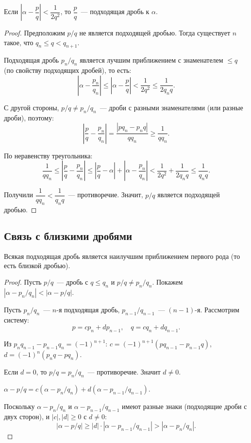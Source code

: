 \documentclass[12pt]{article}
\begin{document}
	\begin{theorem}
		Если $\left|\alpha - \dfrac{p}{q}\right| < \dfrac{1}{2q^2}$, то $\dfrac{p}{q}$~--- подходящая дробь к $\alpha$.
	\end{theorem}
	
	\begin{proof}
		Предположим $p/q$ не является подходящей дробью. Тогда существует $n$ такое, что $q_n \leqslant q < q_{n+1}$.
		
		Подходящая дробь $p_n/q_n$ является лучшим приближением с знаменателем $\leqslant q$ (по свойству подходящих дробей), то есть:
		\[\left|\alpha - \frac{p_n}{q_n}\right| \leqslant \left|\alpha - \frac{p}{q}\right| < \frac{1}{2q^2} \leqslant \frac{1}{2q_n q}.\]
		
		С другой стороны, $p/q \neq p_n/q_n$~--- дроби с разными знаменателями (или разные дроби), поэтому:
		\[\left|\frac{p}{q} - \frac{p_n}{q_n}\right| = \frac{|p q_n - p_n q|}{q q_n} \geqslant \frac{1}{q q_n}.\]
		
		По неравенству треугольника:
		\[\frac{1}{q q_n} \leqslant \left|\frac{p}{q} - \frac{p_n}{q_n}\right| \leqslant \left|\frac{p}{q} - \alpha\right| + \left|\alpha - \frac{p_n}{q_n}\right| < \frac{1}{2q^2} + \frac{1}{2q_n q} \leqslant \frac{1}{q_n q}.\]
		
		Получили $\dfrac{1}{q q_n} < \dfrac{1}{q_n q}$~--- противоречие. Значит, $p/q$ является подходящей дробью.
	\end{proof}
	
	\subsection{Связь с близкими дробями}
	
	\begin{theorem}
		Всякая подходящая дробь является наилучшим приближением первого рода (то есть близкой дробью).
	\end{theorem}
	
	\begin{proof}
		Пусть $p/q$~--- дробь с $q \leqslant q_n$ и $p/q \neq p_n/q_n$. Покажем $|\alpha - p_n/q_n| < |\alpha - p/q|$.
		
		Пусть $p_n/q_n$~--- $n$-я подходящая дробь, $p_{n-1}/q_{n-1}$~--- $(n-1)$-я. Рассмотрим систему:
		\[p = c p_n + d p_{n-1}, \quad q = c q_n + d q_{n-1}.\]
		
		Из $p_n q_{n-1} - p_{n-1} q_n = (-1)^{n+1}$: $c = (-1)^{n+1}(p q_{n-1} - p_{n-1} q)$, $d = (-1)^n(p_n q - p q_n)$.
		
		Если $d = 0$, то $p/q = p_n/q_n$~--- противоречие. Значит $d \neq 0$.
		
		$\alpha - p/q = c(\alpha - p_n/q_n) + d(\alpha - p_{n-1}/q_{n-1})$.
		
		Поскольку $\alpha - p_n/q_n$ и $\alpha - p_{n-1}/q_{n-1}$ имеют разные знаки (подходящие дроби с двух сторон), и $|c|, |d| \geqslant 0$ с $d \neq 0$:
		\[|\alpha - p/q| \geqslant |d| \cdot |\alpha - p_{n-1}/q_{n-1}| > |\alpha - p_n/q_n|.\]
	\end{proof}
	
\end{document}
